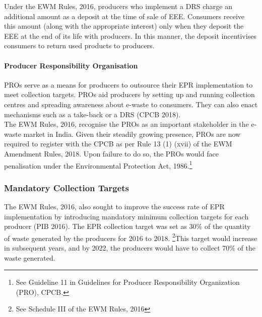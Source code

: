 \documentclass[a4paper, 12pt]{article}
\begin{document}
                    Under the EWM Rules, 2016, producers who implement a DRS charge an additional amount as a deposit at the time of sale of EEE. Consumers receive this amount (along with the appropriate interest) only when they deposit the EEE at the end of its life with producers. In this manner, the deposit incentivises consumers to return used products to producers. \\
                    
                    \paragraph{Producer Responsibility Organisation}
                    
                    PROs serve as a means for producers to outsource their EPR implementation to meet collection targets. PROs aid producers by setting up and running collection centres and spreading awareness about e-waste to consumers. They can also enact mechanisms such as a take-back or a DRS (CPCB 2018). \\
                    
                    The EWM Rules, 2016, recognise the PROs as an important stakeholder in the e-waste market in India. Given their steadily growing presence, PROs are now required to register with the CPCB as per Rule 13 (1) (xvii) of the EWM Amendment Rules, 2018. Upon failure to do so, the PROs would face penalisation under the Environmental Protection Act, 1986.\footnote{See Guideline 11 in Guidelines for Producer Responsibility Organization (PRO), CPCB.} \\
                    
                    \subsubsection{Mandatory Collection Targets}
                    
                    The EWM Rules, 2016, also sought to improve the success rate of EPR implementation by introducing mandatory minimum collection targets for each producer (PIB 2016). The EPR collection target was set as 30\% of the quantity of waste generated by the producers for 2016 to 2018. \footnote{See Schedule III of the EWM Rules, 2016}This target would increase in subsequent years, and by 2022, the producers would have to collect 70\% of the waste generated. \\
                    
\end{document}
